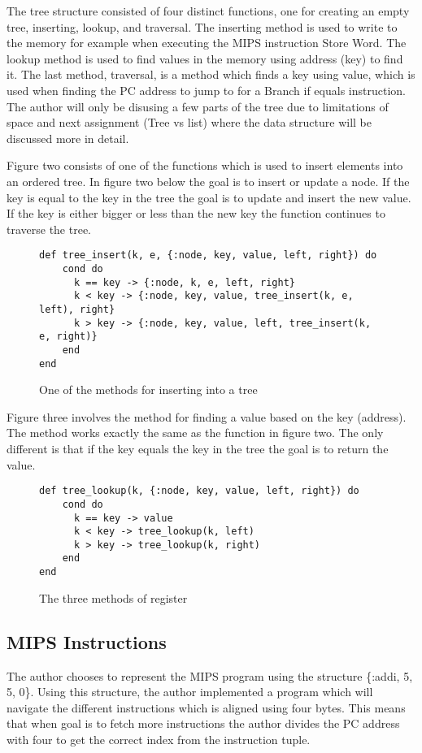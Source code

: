 \documentclass[a4paper,11pt]{article}
\begin{document}
The tree structure consisted of four distinct functions, one for creating an empty tree, inserting, lookup, and traversal. The inserting method is used to write to the memory for example when executing the MIPS instruction Store Word. The lookup method is used to find values in the memory using address (key) to find it. The last method, traversal, is a method which finds a key using value, which is used when finding the PC address to jump to for a Branch if equals instruction. The author will only be disusing a few parts of the tree due to limitations of space and next assignment (Tree vs list) where the data structure will be discussed more in detail.

Figure two consists of one of the functions which is used to insert elements into an ordered tree. In figure two below the goal is to insert or update a node. If the key is equal to the key in the tree the goal is to update and insert the new value. If the key is either bigger or less than the new key the function continues to traverse the tree.

\begin{figure}[H]
\begin{verbatim}
def tree_insert(k, e, {:node, key, value, left, right}) do
    cond do
      k == key -> {:node, k, e, left, right}
      k < key -> {:node, key, value, tree_insert(k, e, left), right}
      k > key -> {:node, key, value, left, tree_insert(k, e, right)}
    end
end
\end{verbatim}
\caption{One of the methods for inserting into a tree}
\label{Figure:2}
\end{figure}

Figure three involves the method for finding a value based on the key (address). The method works exactly the same as the function in figure two. The only different is that if the key equals the key in the tree the goal is to return the value.

\begin{figure}[H]
\begin{verbatim}
def tree_lookup(k, {:node, key, value, left, right}) do
    cond do
      k == key -> value
      k < key -> tree_lookup(k, left)
      k > key -> tree_lookup(k, right)
    end
end
\end{verbatim}
\caption{The three methods of register}
\label{Figure:3}
\end{figure}

\subsection*{MIPS Instructions}
The author chooses to represent the MIPS program using the structure \{:addi, 5, 5, 0\}. Using this structure, the author implemented a program which will navigate the different instructions which is aligned using four bytes. This means that when goal is to fetch more instructions the author divides the PC address with four to get the correct index from the instruction tuple.
\end{document}
